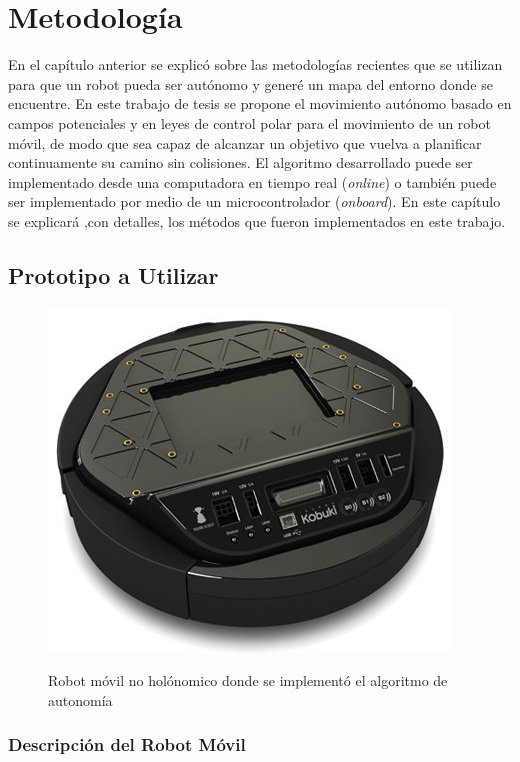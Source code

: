 \chapter{Metodolog\'ia}

En el cap\'itulo anterior se explic\'o sobre las metodolog\'ias recientes que se 
utilizan para que un robot pueda ser aut\'onomo y gener\'e un mapa 
del entorno donde se encuentre. En este trabajo de tesis se propone 
el movimiento aut\'onomo basado en campos potenciales y en leyes de control 
polar para el movimiento de un robot m\'ovil, de modo que sea capaz de alcanzar 
un objetivo que vuelva a planificar continuamente su camino sin colisiones. El 
algoritmo desarrollado puede ser implementado desde una computadora en tiempo 
real (\textit{online}) o tambi\'en puede ser implementado por medio de un 
microcontrolador (\textit{onboard}). En este cap\'itulo se explicar\'a 
,con detalles, los m\'etodos que fueron implementados en este trabajo.

\section{Prototipo a Utilizar}
\begin{figure}%
\centering \footnotesize
{\includegraphics[width=0.40\linewidth]{images/kobuki.jpg}}
\captionsetup{font=footnotesize}
\caption{Robot m\'ovil no hol\'onomico donde se implement\'o el algoritmo de autonom\'ia}
\label{fig:kobuki}
\end{figure}
\subsection{Descripci\'on del Robot M\'ovil}

